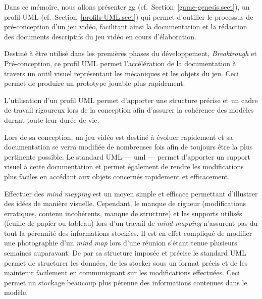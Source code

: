 Dans ce mémoire, nous allons présenter \gls{gg} (cf.~Section~\ref{game-genesis.sect}), un profil UML (cf.~Section~\ref{profils-UML.sect}) qui permet d'outiller le processus de pré-conception d'un jeu vidéo, facilitant ainsi la documentation et la rédaction des documents descriptifs du jeu vidéo en cours d'élaboration.

Destiné à être utilisé dans les premières phases du développement, \emph{Breaktrough} et Pré-conception, ce profil UML permet l'accélération de la documentation à travers un outil visuel représentant les mécaniques et les objets du jeu.
Ceci permet de produire un prototype jouable plus rapidement.

L'utilisation d'un profil UML permet d'apporter une structure précise et un cadre de travail rigoureux lors de la conception afin d'assurer la cohérence des modèles durant toute leur durée de vie.

Lors de sa conception, un jeu vidéo est destiné à évoluer rapidement et sa documentation se verra modifiée de nombreuses fois afin de toujours être la plus pertinente possible.
Le standard UML --- \gls{uml} --- permet d'apporter un support visuel à cette documentation et permet également de rendre les modifications plus faciles en accédant aux objets concernés rapidement et efficacement. 

Effectuer des \emph{mind mapping} est un moyen simple et efficace permettant d'illustrer des idées de manière visuelle.
Cependant, le manque de rigueur (modifications erratiques, contenu incohérents, manque de structure) et les supports utilisés (feuille de papier ou tableau) lors d'un travail de \emph{mind mapping} n'assurent pas du tout la pérennité des informations stockées.
Il est en effet compliqué de modifier une photographie d'un \emph{mind map} lors d'une réunion s'étant tenue plusieurs semaines auparavant.
De par sa structure imposée et précise le standard UML permet de structurer les données, de les stocker sous un format précis et de les maintenir facilement en communiquant sur les modifications effectuées.
Ceci permet un stockage beaucoup plus pérenne des informations contenues dans le modèle.



